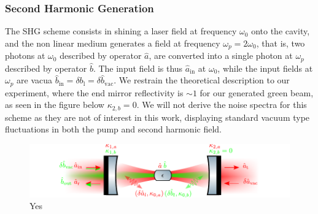 \subsubsection{Second Harmonic Generation}

The SHG scheme consists in shining a laser field at frequency $\omega_0$ onto the cavity, and the non linear medium generates a field at frequency $\omega_p = 2\omega_0$, that is, two photons at $\omega_0$ described by operator $\hat{a}$, are converted into a single photon at $\omega_p$ described by operator $\hat{b}$. The input field is thus $\hat{a}_{\mathrm{in}}$ at $\omega_0$, while the input fields at $\omega_p$ are vacua $\hat{b}_{\mathrm{in}} = \delta {b}_{\mathrm{l}}= \delta \hat{b}_{\mathrm{vac}}$. We restrain the theoretical description to our experiment, where the end mirror reflectivity is $\sim 1$ for our generated green beam, as seen in the figure below $\kappa_{2,b}=0$. We will not derive the noise spectra for this scheme as they are not of interest in this work, displaying standard vacuum type fluctuations in both the pump and second harmonic field.
\begin{figure}[h]
\centering
\includegraphics[width=\textwidth]{./chap2/fig/cavitySHG copy.pdf}
\caption{Yes} 
\end{figure}

